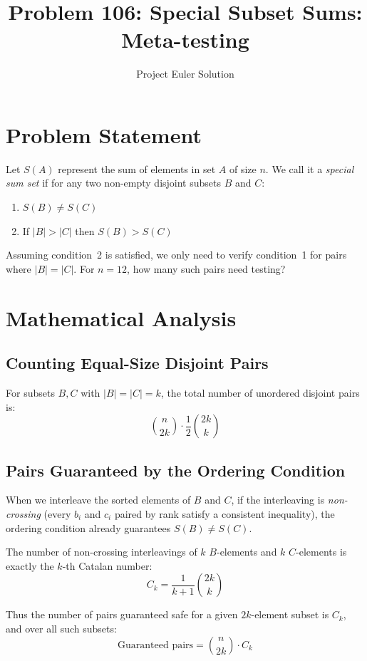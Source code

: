 \documentclass[12pt,a4paper]{article}
\title{Problem 106: Special Subset Sums: Meta-testing}
\author{Project Euler Solution}
\date{}
\begin{document}
\maketitle

\section{Problem Statement}

Let $S(A)$ represent the sum of elements in set $A$ of size $n$. We call it a \emph{special sum set} if for any two non-empty disjoint subsets $B$ and $C$:
\begin{enumerate}
    \item $S(B) \neq S(C)$
    \item If $|B| > |C|$ then $S(B) > S(C)$
\end{enumerate}

Assuming condition~2 is satisfied, we only need to verify condition~1 for pairs where $|B| = |C|$. For $n = 12$, how many such pairs need testing?

\section{Mathematical Analysis}

\subsection{Counting Equal-Size Disjoint Pairs}

For subsets $B, C$ with $|B| = |C| = k$, the total number of unordered disjoint pairs is:
\[
\binom{n}{2k} \cdot \frac{1}{2}\binom{2k}{k}
\]

\subsection{Pairs Guaranteed by the Ordering Condition}

When we interleave the sorted elements of $B$ and $C$, if the interleaving is \emph{non-crossing} (every $b_i$ and $c_i$ paired by rank satisfy a consistent inequality), the ordering condition already guarantees $S(B) \neq S(C)$.

The number of non-crossing interleavings of $k$ $B$-elements and $k$ $C$-elements is exactly the $k$-th Catalan number:
\[
C_k = \frac{1}{k+1}\binom{2k}{k}
\]

Thus the number of pairs guaranteed safe for a given $2k$-element subset is $C_k$, and over all such subsets:
\[
\text{Guaranteed pairs} = \binom{n}{2k} \cdot C_k
\]
\end{document}
